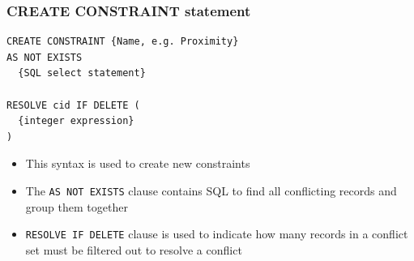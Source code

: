 \documentclass{beamer}
\begin{document}
\begin{frame}[fragile]
\frametitle{CREATE CONSTRAINT statement}
\begin{lstlisting}
CREATE CONSTRAINT {Name, e.g. Proximity}
AS NOT EXISTS
  {SQL select statement}
  
RESOLVE cid IF DELETE (
  {integer expression}
)
\end{lstlisting}

\begin{itemize}
\item This syntax is used to create new constraints
\item The \texttt{AS NOT EXISTS} clause contains SQL to find all conflicting records and group them together
\item \texttt{RESOLVE IF DELETE} clause is used to indicate how many records in a conflict set must be filtered out to resolve a conflict
\end{itemize}
\end{frame}
\end{document}
